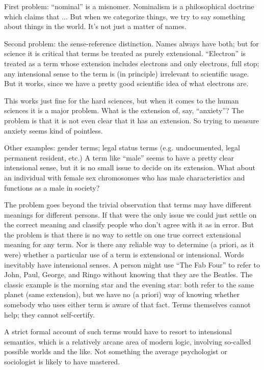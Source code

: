 \documentclass[11pt,twoside]{article}
\begin{document}
First problem: ``nominal'' is a misnomer.  Nominalism is a
philosophical doctrine which claims that ...  But when we categorize
things, we try to say something about things in the world.  It's not
just a matter of names.

Second problem: the sense-reference distinction.  Names always have
both; but for science it is critical that terms be treated as purely
extensional.  ``Electron'' is treated as a term whose extension
includes electrons and only electrons, full stop; any intensional
sense to the term is (in principle) irrelevant to scientific usage.
But it works, since we have a pretty good scientific idea of what
electrons are.

This works just fine for the hard sciences, but when it comes to the
human sciences it is a major problem.  What is the extension of, say,
``anxiety''?  The problem is that it is not even clear that it has an
extension.  So trying to measure anxiety seems kind of pointless.

Other examples: gender terms; legal status terms (e.g. undocumented,
legal permanent resident, etc.)  A term like ``male'' seems to have a
pretty clear intensional sense, but it is no small issue to decide on
its extension.  What about an individual with female sex chromosomes
who has male characteristics and functions as a male in society?

The problem goes beyond the trivial observation that terms may have
different meanings for different persons.  If that were the only issue
we could just settle on the correct meaning and classify people who
don't agree with it as in error.  But the problem is that there is no
way to settle on one true correct extensional meaning for any term.
Nor is there any reliable way to determine (a priori, as it were)
whether a particular use of a term is extensional or intensional.
Words inevitably have intensional senses.  A person might use ``The
Fab Four'' to refer to John, Paul, George, and Ringo without knowing
that they are the Beatles.  The classic example is the morning star
and the evening star: both refer to the same planet (same extension),
but we have no (a priori) way of knowing whether somebody who uses
either term is aware of that fact.  Terms themselves cannot help; they
cannot self-certify.

A strict formal account of such terms would have to resort to
intensional semantics, which is a relatively arcane area of modern
logic, involving so-called possible worlds and the like.  Not
something the average psychologist or sociologist is likely to have
mastered.
\end{document}
